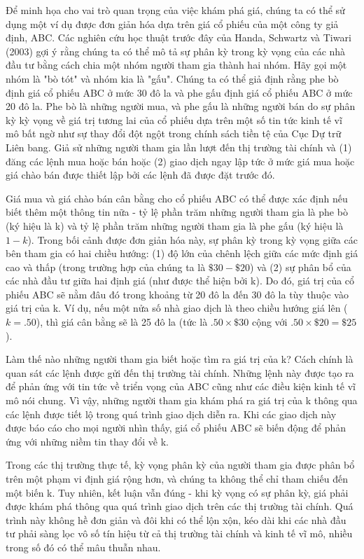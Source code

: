Để minh họa cho vai trò quan trọng của việc khám phá giá, chúng ta có thể sử dụng một ví dụ được đơn giản hóa dựa trên giá cổ phiếu của một công ty giả định, ABC. Các nghiên cứu học thuật trước đây của Handa, Schwartz và Tiwari (2003) gợi ý rằng chúng ta có thể mô tả sự phân kỳ trong kỳ vọng của các nhà đầu tư bằng cách chia một nhóm người tham gia thành hai nhóm. Hãy gọi một nhóm là "bò tót" và nhóm kia là "gấu". Chúng ta có thể giả định rằng phe bò định giá cổ phiếu ABC ở mức 30 đô la và phe gấu định giá cổ phiếu ABC ở mức 20 đô la. Phe bò là những người mua, và phe gấu là những người bán do sự phân kỳ kỳ vọng về giá trị tương lai của cổ phiếu dựa trên một số tin tức kinh tế vĩ mô bất ngờ như sự thay đổi đột ngột trong chính sách tiền tệ của Cục Dự trữ Liên bang. Giả sử những người tham gia lần lượt đến thị trường tài chính và (1) đăng các lệnh mua hoặc bán hoặc (2) giao dịch ngay lập tức ở mức giá mua hoặc giá chào bán được thiết lập bởi các lệnh đã được đặt trước đó. 

Giá mua và giá chào bán cân bằng cho cổ phiếu ABC có thể được xác định nếu biết thêm một thông tin nữa - tỷ lệ phần trăm những người tham gia là phe bò (ký hiệu là k) và tỷ lệ phần trăm những người tham gia là phe gấu (ký hiệu là $1-k$). Trong bối cảnh được đơn giản hóa này, sự phân kỳ trong kỳ vọng giữa các bên tham gia có hai chiều hướng: (1) độ lớn của chênh lệch giữa các mức định giá cao và thấp (trong trường hợp của chúng ta là $\$30-\$20$) và (2) sự phân bổ của các nhà đầu tư giữa hai định giá (như được thể hiện bởi k). Do đó, giá trị của cổ phiếu ABC sẽ nằm đâu đó trong khoảng từ 20 đô la đến 30 đô la tùy thuộc vào giá trị của k. Ví dụ, nếu một nửa số nhà giao dịch là theo chiều hướng giá lên ($k=.50$), thì giá cân bằng sẽ là 25 đô la (tức là $.50\times\$30$ cộng với $.50\times\$20=\$25$).

Làm thế nào những người tham gia biết hoặc tìm ra giá trị của k? Cách chính là quan sát các lệnh được gửi đến thị trường tài chính. Những lệnh này được tạo ra để phản ứng với tin tức về triển vọng của ABC cũng như các điều kiện kinh tế vĩ mô nói chung. Vì vậy, những người tham gia khám phá ra giá trị của k thông qua các lệnh được tiết lộ trong quá trình giao dịch diễn ra. Khi các giao dịch này được báo cáo cho mọi người nhìn thấy, giá cổ phiếu ABC sẽ biến động để phản ứng với những niềm tin thay đổi về k.

Trong các thị trường thực tế, kỳ vọng phân kỳ của người tham gia được phân bổ trên một phạm vi định giá rộng hơn, và chúng ta không thể chỉ tham chiếu đến một biến k. Tuy nhiên, kết luận vẫn đúng - khi kỳ vọng có sự phân kỳ, giá phải được khám phá thông qua quá trình giao dịch trên các thị trường tài chính. Quá trình này không hề đơn giản và đôi khi có thể lộn xộn, kéo dài khi các nhà đầu tư phải sàng lọc vô số tín hiệu từ cả thị trường tài chính và kinh tế vĩ mô, nhiều trong số đó có thể mâu thuẫn nhau.


